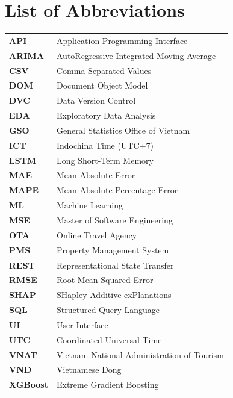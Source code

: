 \chapter*{List of Abbreviations}

\begin{longtable}{p{3cm} p{11.5cm}}
\textbf{API} & Application Programming Interface \\
\textbf{ARIMA} & AutoRegressive Integrated Moving Average \\
\textbf{CSV} & Comma-Separated Values \\
\textbf{DOM} & Document Object Model \\
\textbf{DVC} & Data Version Control \\
\textbf{EDA} & Exploratory Data Analysis \\
\textbf{GSO} & General Statistics Office of Vietnam \\
\textbf{ICT} & Indochina Time (UTC+7) \\
\textbf{LSTM} & Long Short-Term Memory \\
\textbf{MAE} & Mean Absolute Error \\
\textbf{MAPE} & Mean Absolute Percentage Error \\
\textbf{ML} & Machine Learning \\
\textbf{MSE} & Master of Software Engineering \\
\textbf{OTA} & Online Travel Agency \\
\textbf{PMS} & Property Management System \\
\textbf{REST} & Representational State Transfer \\
\textbf{RMSE} & Root Mean Squared Error \\
\textbf{SHAP} & SHapley Additive exPlanations \\
\textbf{SQL} & Structured Query Language \\
\textbf{UI} & User Interface \\
\textbf{UTC} & Coordinated Universal Time \\
\textbf{VNAT} & Vietnam National Administration of Tourism \\
\textbf{VND} & Vietnamese Dong \\
\textbf{XGBoost} & Extreme Gradient Boosting \\
\end{longtable}

\newpage
